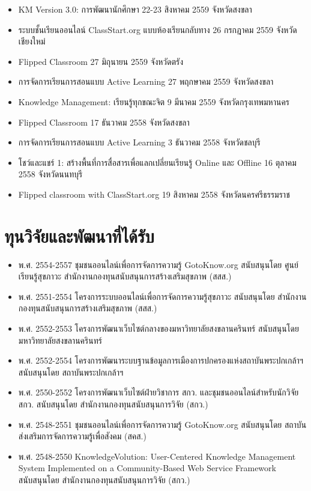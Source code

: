 \begin{appendices}
\begin{itemize}
	\item KM Version 3.0: การพัฒนานักศึกษา 22-23 สิงหาคม 2559  จังหวัดสงขลา
	\item ระบบชั้นเรียนออนไลน์ ClassStart.org แบบห้องเรียนกลับทาง 26 กรกฎาคม 2559  จังหวัดเชียงใหม่
	\item Flipped Classroom 27 มิถุนายน 2559  จังหวัดตรัง
	\item การจัดการเรียนการสอนแบบ Active Learning 27 พฤกษาคม 2559 จังหวัดสงขลา
	\item Knowledge Management: เรียนรู้ทุกขณะจิต 9 มีนาคม 2559  จังหวัดกรุงเทพมหานคร
	\item Flipped Classroom 17 ธันวาคม 2558 จังหวัดสงขลา
	\item การจัดการเรียนการสอนแบบ Active Learning 3 ธันวาคม 2558  จังหวัดชลบุรี
	\item โชว์และแชร์ 1: สร้างพื้นที่การสื่อสารเพื่อแลกเปลี่ยนเรียนรู้ Online และ Offline  16 ตุลาคม 2558 จังหวัดนนทบุรี
	\item Flipped classroom with ClassStart.org 19 สิงหาคม 2558  จังหวัดนครศรีธรรมราช
\end{itemize}

\section*{ทุนวิจัยและพัฒนาที่ได้รับ}

\begin{itemize}
	\item พ.ศ. 2554-2557 ชุมชนออนไลน์เพื่อการจัดการความรู้ GotoKnow.org สนับสนุนโดย ศูนย์เรียนรู้สุขภาวะ สำนักงานกองทุนสนับสนุนการสร้างเสริมสุขภาพ (สสส.)
	\item พ.ศ. 2551-2554 โครงการระบบออนไลน์เพื่อการจัดการความรู้สุขภาวะ สนับสนุนโดย สำนักงานกองทุนสนับสนุนการสร้างเสริมสุขภาพ (สสส.)
	\item พ.ศ. 2552-2553 โครงการพัฒนาเว็บไซต์กลางของมหาวิทยาลัยสงขลานครินทร์ สนับสนุนโดย มหาวิทยาลัยสงขลานครินทร์
	\item พ.ศ. 2552-2554 โครงการพัฒนาระบบฐานข้อมูลการเมืองการปกครองแห่งสถาบันพระปกเกล้าฯ สนับสนุนโดย สถาบันพระปกเกล้าฯ
	\item พ.ศ. 2550-2552 โครงการพัฒนาเว็บไซต์ฝ่ายวิชาการ สกว. และชุมชนออนไลน์สำหรับนักวิจัย สกว. สนับสนุนโดย สำนักงานกองทุนสนับสนุนการวิจัย (สกว.)
	\item พ.ศ. 2548-2551 ชุมชนออนไลน์เพื่อการจัดการความรู้ GotoKnow.org สนับสนุนโดย สถาบันส่งเสริมการจัดการความรู้เพื่อสังคม (สคส.)
	\item พ.ศ. 2548-2550 KnowledgeVolution: User-Centered Knowledge Management System Implemented on a Community-Based Web Service Framework สนับสนุนโดย สำนักงานกองทุนสนับสนุนการวิจัย (สกว.)
\end{itemize}


\end{appendices}

